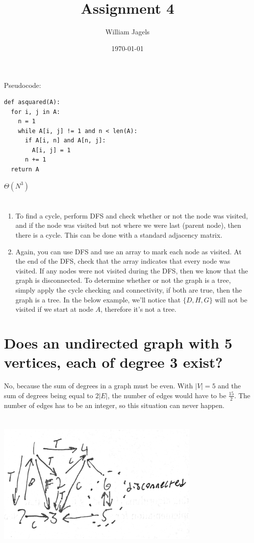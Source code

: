\documentclass[a4paper,12pt]{article}
\title{Assignment 4}
\author{William Jagels}
\date{\today}
\begin{document}
\maketitle

\section{}
Pseudocode:
\begin{lstlisting}
def asquared(A):
  for i, j in A:
    n = 1
    while A[i, j] != 1 and n < len(A):
      if A[i, n] and A[n, j]:
        A[i, j] = 1
      n += 1
  return A
\end{lstlisting}
$\Theta(N^3)$
\section{}
\begin{enumerate}
  \item To find a cycle, perform DFS and check whether or not the node was visited, and if
    the node was visited but not where we were last (parent node), then there is a cycle.
    This can be done with a standard adjacency matrix.
  \item Again, you can use DFS and use an array to mark each node as visited.
    At the end of the DFS, check that the array indicates that every node was visited.
    If any nodes were not visited during the DFS, then we know that the graph is disconnected.
    To determine whether or not the graph is a tree, simply apply the cycle checking and
    connectivity, if both are true, then the graph is a tree.
    In the below example, we'll notice that $\{D, H, G\}$ will not be visited if we start at
    node $A$, therefore it's not a tree.
\end{enumerate}
\section{Does an undirected graph with 5 vertices, each of degree 3 exist?}
No, because the sum of degrees in a graph must be even.
With $|V| = 5$ and the sum of degrees being equal to $2|E|$, the number of edges would have
to be $\frac{15}{2}$.
The number of edges has to be an integer, so this situation can never happen.
\section{}
\includegraphics[width=10cm]{bfs}
\end{document}
